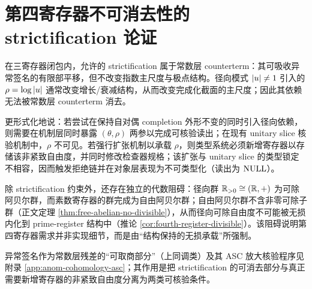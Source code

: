 \section{第四寄存器不可消去性的 strictification 论证}\label{app:strictification}

在三寄存器闭包内，允许的 strictification 属于常数层 counterterm：其可吸收异常签名的有限部平移，但不改变指数主尺度与极点结构。径向模式 $\left\lvert u\right\rvert\neq 1$ 引入的 $\rho=\log\left\lvert u\right\rvert$ 通常改变增长/衰减结构，从而改变完成化截面的主尺度；因此其依赖无法被常数层 counterterm 消去。

更形式化地说：若尝试在保持自对偶 completion 外形不变的同时引入径向依赖，则需要在机制层同时暴露 $(\theta,\rho)$ 两参以完成可核验读出；在现有 unitary slice 核验机制中，$\rho$ 不可见。若强行扩张机制以承载 $\rho$，则类型系统必须新增寄存器以存储该非紧致自由度，并同时修改检查器规格；该扩张与 unitary slice 的类型锁定不相容，因而触发拒绝链并在对象层表现为不可类型化（读出为 $\mathrm{NULL}$）。

除 strictification 约束外，还存在独立的代数阻碍：径向群 $\mathbb{R}_{>0}\cong(\mathbb{R},+)$ 为可除阿贝尔群，而素数寄存器的群完成为自由阿贝尔群；自由阿贝尔群不含非零可除子群（正文定理 \ref{thm:free-abelian-no-divisible}），从而径向可除自由度不可能被无损内化到 prime-register 结构中（推论 \ref{cor:fourth-register-divisible}）。该阻碍说明第四寄存器需求并非实现细节，而是由“结构保持的无损承载”所强制。

异常签名作为常数层残差的“可取商部分”（上同调类）及其 ASC 放大核验程序见附录 \ref{app:anom-cohomology-asc}；其作用是把 strictification 的可消去部分与真正需要新增寄存器的非紧致自由度分离为两类可核验条件。

